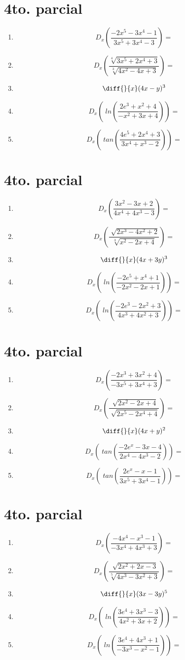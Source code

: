 \documentclass[oneside,spanish,letter]{article}
\begin{document}
\section{4to. parcial}
\begin{enumerate}
 \item $$ D_x \left( \frac{-2x^5-3x^4-1}{3x^5+3x^4-3}\right)=$$
 \item $$ D_x \left( \frac{\sqrt[4]{3x^5+2x^4+3}}{\sqrt[3]{4x^2-4x+3}}\right)=$$
\item $$\diff{}{x}(4x-y)^3$$
 \item $$ D_x \left(\;ln\left( \frac{2e^3+x^2+4}{-x^2+3x+4}\right)\right)=$$
 \item $$ D_x \left(\;tan\left( \frac{4e^5+2x^4+3}{3x^4+x^3-2}\right)\right)=$$
 \end{enumerate}
  \newpage
\section{4to. parcial}
\begin{enumerate}
 \item $$ D_x \left( \frac{3x^2-3x+2}{4x^4+4x^3-3}\right)=$$
 \item $$ D_x \left( \frac{\sqrt[]{2x^3-4x^2+2}}{\sqrt[3]{x^2-2x+4}}\right)=$$
\item $$\diff{}{x}(4x+3y)^3$$
 \item $$ D_x \left(\;ln\left( \frac{-2e^5+x^4+1}{-2x^2-2x+1}\right)\right)=$$
 \item $$ D_x \left(\;ln\left( \frac{-2e^3-2x^2+3}{4x^3+4x^2+3}\right)\right)=$$
 \end{enumerate}
  \newpage
\section{4to. parcial}
\begin{enumerate}
 \item $$ D_x \left( \frac{-2x^3+3x^2+4}{-3x^5+3x^4+3}\right)=$$
 \item $$ D_x \left( \frac{\sqrt[]{2x^2-2x+4}}{\sqrt[]{2x^5-2x^4+4}}\right)=$$
\item $$\diff{}{x}(4x+y)^2$$
 \item $$ D_x \left(\;tan\left( \frac{-2e^x-3x-4}{2x^4-4x^3-2}\right)\right)=$$
 \item $$ D_x \left(\;tan\left( \frac{2e^x-x-1}{3x^5+3x^4-1}\right)\right)=$$
 \end{enumerate}
  \newpage
\section{4to. parcial}
\begin{enumerate}
 \item $$ D_x \left( \frac{-4x^4-x^3-1}{-3x^4+4x^3+3}\right)=$$
 \item $$ D_x \left( \frac{\sqrt[]{2x^2+2x-3}}{\sqrt[5]{4x^3-3x^2+3}}\right)=$$
\item $$\diff{}{x}(3x-3y)^5$$
 \item $$ D_x \left(\;ln\left( \frac{3e^4+3x^3-3}{4x^2+3x+2}\right)\right)=$$
 \item $$ D_x \left(\;ln\left( \frac{3e^4+4x^3+1}{-3x^3-x^2-1}\right)\right)=$$
 \end{enumerate}
  \newpage
\end{document}
